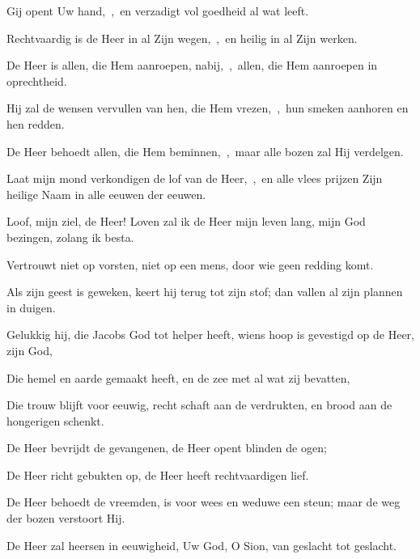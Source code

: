 \documentclass[12pt,twoside,a5paper]{article}
\begin{document}
\begin{halfparskip}
  Gij opent Uw hand,~\sep\ en verzadigt vol goedheid al wat leeft.

  Rechtvaardig is de Heer in al Zijn wegen,~\sep\ en heilig in al Zijn werken.

  De Heer is allen, die Hem aanroepen, nabij,~\sep\ allen, die Hem aanroepen in oprechtheid.

  Hij zal de wensen vervullen van hen, die Hem vrezen,~\sep\ hun smeken aanhoren en hen redden.

  De Heer behoedt allen, die Hem beminnen,~\sep\ maar alle bozen zal Hij verdelgen.

  Laat mijn mond verkondigen de lof van de Heer,~\sep\ en alle vlees prijzen Zijn heilige Naam in alle eeuwen der eeuwen.
\end{halfparskip}


\begin{halfparskip}
  Loof, mijn ziel, de Heer! Loven zal ik de Heer mijn leven lang, mijn God bezingen, zolang ik besta.


  Vertrouwt niet op vorsten, niet op een mens, door wie geen redding komt.

  Als zijn geest is geweken, keert hij terug tot zijn stof; dan vallen al zijn plannen in duigen.

  Gelukkig hij, die Jacobs God tot helper heeft, wiens hoop is gevestigd op de Heer, zijn God,

  Die hemel en aarde gemaakt heeft, en de zee met al wat zij bevatten,

  Die trouw blijft voor eeuwig, recht schaft aan de verdrukten, en brood aan de hongerigen schenkt.

  De Heer bevrijdt de gevangenen, de Heer opent blinden de ogen;

  De Heer richt gebukten op, de Heer heeft rechtvaardigen lief.

  De Heer behoedt de vreemden, is voor wees en weduwe een steun; maar de weg der bozen verstoort Hij.

  De Heer zal heersen in eeuwigheid, Uw God, O Sion, van geslacht tot geslacht.
\end{halfparskip}

\end{document}
